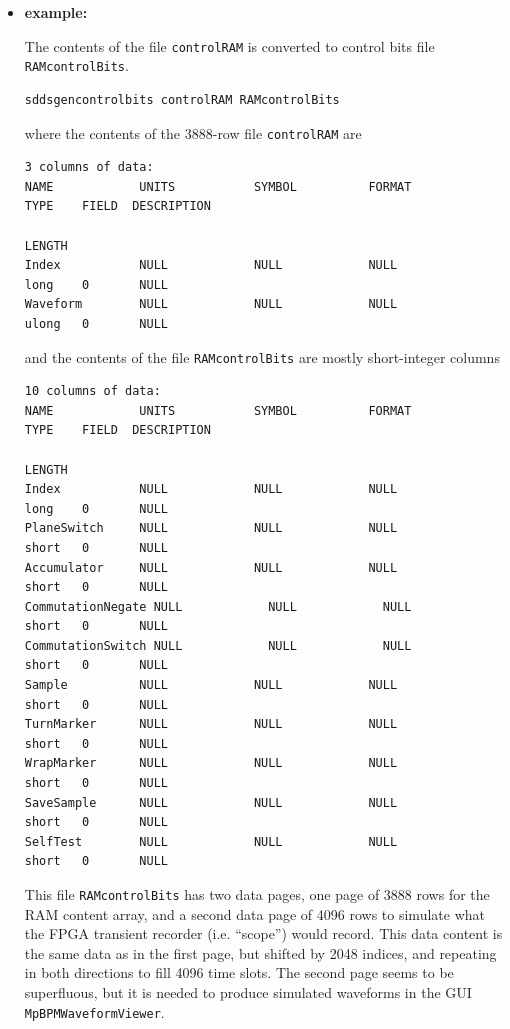 \begin{itemize}
\item {\bf example:} 
%
% 
%

The contents of the file {\tt controlRAM} is converted to control bits
file {\tt RAMcontrolBits}.
\begin{verbatim}
sddsgencontrolbits controlRAM RAMcontrolBits
\end{verbatim}
where the contents of the 3888-row file {\tt controlRAM} are 
\begin{verbatim}
3 columns of data:
NAME            UNITS           SYMBOL          FORMAT          TYPE    FIELD  DESCRIPTION
                                                                        LENGTH
Index           NULL            NULL            NULL            long    0       NULL
Waveform        NULL            NULL            NULL            ulong   0       NULL
\end{verbatim}
and the contents of the file {\tt RAMcontrolBits} are mostly short-integer columns
\begin{verbatim}
10 columns of data:
NAME            UNITS           SYMBOL          FORMAT          TYPE    FIELD  DESCRIPTION
                                                                        LENGTH
Index           NULL            NULL            NULL            long    0       NULL
PlaneSwitch     NULL            NULL            NULL            short   0       NULL
Accumulator     NULL            NULL            NULL            short   0       NULL
CommutationNegate NULL            NULL            NULL            short   0       NULL
CommutationSwitch NULL            NULL            NULL            short   0       NULL
Sample          NULL            NULL            NULL            short   0       NULL
TurnMarker      NULL            NULL            NULL            short   0       NULL
WrapMarker      NULL            NULL            NULL            short   0       NULL
SaveSample      NULL            NULL            NULL            short   0       NULL
SelfTest        NULL            NULL            NULL            short   0       NULL
\end{verbatim}
This file {\tt RAMcontrolBits} has two data pages, one page of 3888
rows for the RAM content array, and a second data page of 4096 rows to
simulate what the FPGA transient recorder (i.e. ``scope'') would
record. This data content is the same data as in the first page, but
shifted by 2048 indices, and repeating in both directions to fill 4096
time slots. The second page seems to be superfluous, but it is needed
to produce simulated waveforms in the GUI {\tt MpBPMWaveformViewer}.


\end{itemize}

